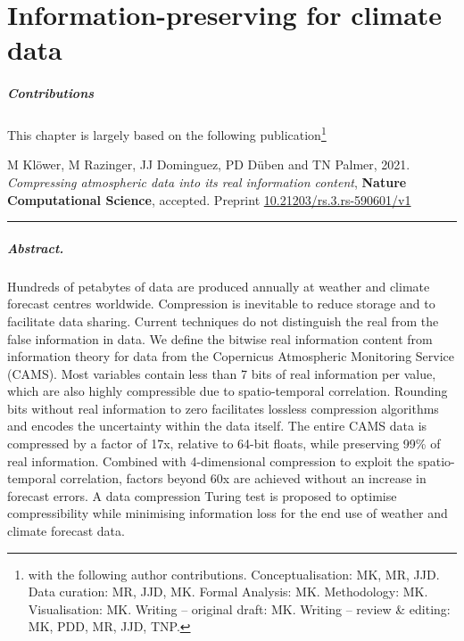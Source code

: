 \chapter{Information-preserving  for climate data}
\label{chap:compression}

\small \paragraph{Contributions} This chapter is largely based on the following publication\footnote{with the following author contributions.
Conceptualisation: MK, MR, JJD. Data curation: MR, JJD, MK. Formal Analysis: MK. Methodology: MK. Visualisation: MK. Writing –
original draft: MK. Writing – review \& editing: MK, PDD, MR, JJD, TNP.}

\vspace{\baselineskip}
\indent M Klöwer, M Razinger, JJ Dominguez, PD Düben and TN Palmer, 2021. \emph{Compressing atmospheric data into its real
information content}, \textbf{Nature Computational Science}, accepted. Preprint \href{https://doi.org/10.21203/rs.3.rs-590601/v1}{10.21203/rs.3.rs-590601/v1}
\vspace{\baselineskip}
\hrule
\vspace{\baselineskip}
\normalsize

\paragraph{Abstract.} Hundreds of petabytes of data are produced annually at weather and climate forecast centres worldwide.
Compression is inevitable to reduce storage and to facilitate data sharing. Current techniques do not distinguish the real from
the false information in data. We define the bitwise real information content from information theory for data from the Copernicus
Atmospheric Monitoring Service (CAMS). Most variables contain less than 7 bits of real information per value, which are also highly
compressible due to spatio-temporal correlation. Rounding bits without real information to zero facilitates lossless compression
algorithms and encodes the uncertainty within the data itself. The entire CAMS data is compressed by a factor of 17x, relative to
64-bit floats, while preserving 99\% of real information. Combined with 4-dimensional compression to exploit the spatio-temporal
correlation, factors beyond 60x are achieved without an increase in forecast errors. A data compression Turing test is proposed to
optimise compressibility while minimising information loss for the end use of weather and climate forecast data. 

